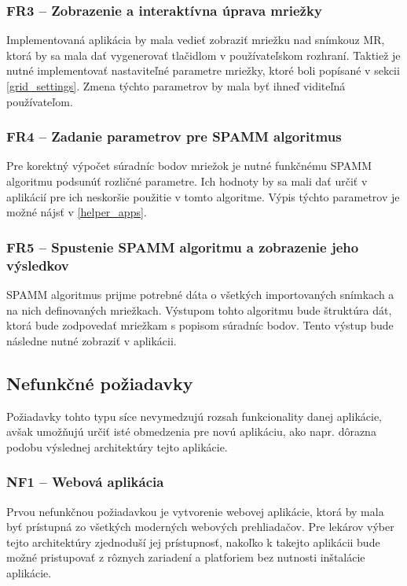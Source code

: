 \subsubsection {FR3 -- Zobrazenie a interaktívna úprava mriežky}\label{fr3}
Implementovaná aplikácia by mala vedieť zobraziť mriežku nad snímkou\newline z MR, ktorá by sa mala dať vygenerovať tlačidlom v používateľskom rozhraní. Taktiež je nutné implementovať nastaviteľné parametre mriežky, ktoré boli popísané v sekcii \ref{grid_settings}. Zmena týchto parametrov by mala byť ihneď viditeľná používateľom.

\subsubsection {FR4 -- Zadanie parametrov pre SPAMM algoritmus}\label{fr4}
Pre korektný výpočet súradníc bodov mriežok je nutné funkčnému SPAMM algoritmu podsunúť rozličné parametre. Ich hodnoty by sa mali dať určiť v aplikácií pre ich neskoršie použitie v tomto algoritme. Výpis týchto parametrov je možné nájsť v \ref{helper_apps}.

\subsubsection {FR5 -- Spustenie SPAMM algoritmu a zobrazenie jeho výsledkov}\label{fr5}
SPAMM algoritmus prijme potrebné dáta o všetkých importovaných snímkach a na nich definovaných mriežkach. Výstupom tohto algoritmu bude štruktúra dát, ktorá bude zodpovedať mriežkam s popisom súradníc bodov. Tento výstup bude následne nutné zobraziť v aplikácii.

\subsection {Nefunkčné požiadavky}
Požiadavky tohto typu síce nevymedzujú rozsah funkcionality danej aplikácie, avšak umožňujú určiť isté obmedzenia pre novú aplikáciu, ako napr. dôraz\newline na podobu výslednej architektúry tejto aplikácie.

\subsubsection {NF1 -- Webová aplikácia}
Prvou nefunkčnou požiadavkou je vytvorenie webovej aplikácie, ktorá by mala byť prístupná zo všetkých moderných webových prehliadačov. Pre lekárov výber tejto architektúry zjednoduší jej prístupnosť, nakoľko k takejto aplikácii bude možné pristupovať z rôznych zariadení a platforiem bez nutnosti inštalácie aplikácie.


